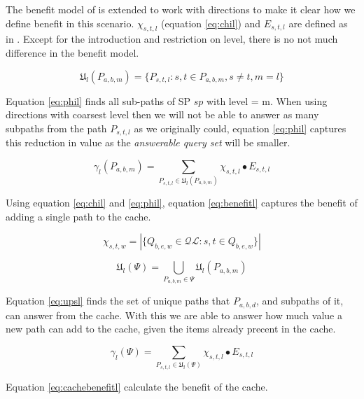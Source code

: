 The benefit model of \cite{thomsen2012} is extended to work with directions to make it clear how we define benefit in this
scenario. $\chi_{s,t,l}$ (equation \ref{eq:chil}) and $E_{s,t,l}$ are defined as in \cite{thomsen2012}. Except for the introduction and restriction on level, there is no not much difference in the benefit model.


\begin{equation} \label{eq:phil}
\mathfrak{U}_l(P_{a,b,m}) = \{ P_{s,t,l} : s, t \in P_{a,b,m},  s \neq t,  m = l\}
\end{equation}

Equation \ref{eq:phil} finds all sub-paths of SP $sp$ with level = m. When using directions with coarsest level then we will not be able to answer as many subpaths from the path $P_{s,t,l}$ as we originally could, equation \ref{eq:phil} captures this reduction in value as the \textit{answerable query set} will be smaller.


\begin{equation} \label{eq:benefitl}
\gamma_l(P_{a,b,m}) = \sum\limits_{P_{s,t,l} \in \mathfrak{U}_l(P_{a,b,m})} \chi_{s,t,l} \bullet E_{s,t,l}
\end{equation}

Using equation \ref{eq:chil} and \ref{eq:phil}, equation \ref{eq:benefitl} captures the benefit of adding a single path to the cache.

\begin{equation} \label{eq:chil}
\chi_{s,t,w} =  |\{ Q_{b,e,w} \in \mathcal{QL}: s, t \in Q_{b,e,w} \}|
\end{equation}


\begin{equation} \label{eq:upsl}
 \mathfrak{U}_l(\Psi) = \bigcup\limits_{P_{a,b,m} \in \Psi} \mathfrak{U}_l(P_{a,b,m})
\end{equation}

Equation \ref{eq:upsl} finds the set of unique paths that $P_{a,b,d}$, and subpaths of it, can answer from the cache. With this we are able to answer how much value a new path can add to the cache, given the items already precent in the cache.

\begin{equation} \label{eq:cachebenefitl}
\gamma_l(\Psi) = \sum\limits_{P_{s,t,l} \in \mathfrak{U}_l(\Psi)} \chi_{s,t,l} \bullet E_{s,t,l}
\end{equation}

Equation \ref{eq:cachebenefitl} calculate the benefit of the cache.




